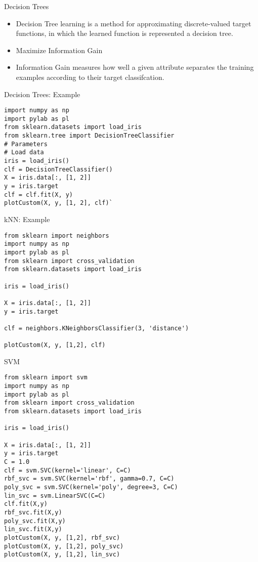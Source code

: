 \begin{frame}{Decision Trees}

\begin{itemize}
\itemsep1pt\parskip0pt
\item
  Decision Tree learning is a method for approximating discrete-valued
  target functions, in which the learned function is represented a
  decision tree.
\item
  Maximize Information Gain
\item
  Information Gain measures how well a given attribute separates the
  training examples according to their target classifcation.
\end{itemize}

\end{frame}

\begin{frame}[fragile]{Decision Trees: Example}

\begin{verbatim}
import numpy as np
import pylab as pl
from sklearn.datasets import load_iris
from sklearn.tree import DecisionTreeClassifier
# Parameters
# Load data
iris = load_iris()
clf = DecisionTreeClassifier()
X = iris.data[:, [1, 2]]
y = iris.target
clf = clf.fit(X, y)
plotCustom(X, y, [1, 2], clf)`
\end{verbatim}

\end{frame}

\begin{frame}[fragile]{kNN: Example}

\begin{verbatim}
from sklearn import neighbors
import numpy as np
import pylab as pl
from sklearn import cross_validation
from sklearn.datasets import load_iris

iris = load_iris()

X = iris.data[:, [1, 2]]
y = iris.target

clf = neighbors.KNeighborsClassifier(3, 'distance')

plotCustom(X, y, [1,2], clf)
\end{verbatim}

\end{frame}

\begin{frame}[fragile]{SVM}

\begin{verbatim}
from sklearn import svm
import numpy as np
import pylab as pl
from sklearn import cross_validation
from sklearn.datasets import load_iris

iris = load_iris()

X = iris.data[:, [1, 2]]
y = iris.target
C = 1.0
clf = svm.SVC(kernel='linear', C=C)
rbf_svc = svm.SVC(kernel='rbf', gamma=0.7, C=C)
poly_svc = svm.SVC(kernel='poly', degree=3, C=C)
lin_svc = svm.LinearSVC(C=C)
clf.fit(X,y)
rbf_svc.fit(X,y)
poly_svc.fit(X,y)
lin_svc.fit(X,y)
plotCustom(X, y, [1,2], rbf_svc)
plotCustom(X, y, [1,2], poly_svc)
plotCustom(X, y, [1,2], lin_svc)
\end{verbatim}

\end{frame}

